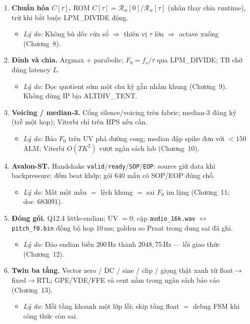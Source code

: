 \begin{enumerate}
\item \textbf{Chuẩn hóa $C[\tau]$.} ROM $C[\tau]=\mathcal{R}_w[0]/\mathcal{R}_w[\tau]$ (nhân thay chia runtime), trừ khi bắt buộc LPM\_DIVIDE động.
\begin{itemize}[leftmargin=1.2em]
    \item \emph{Lý do:} Không bù dốc cửa sổ $\Rightarrow$ thiên vị $\tau$ lớn $\Rightarrow$ octave xuống (Chương~8).
\end{itemize}

\item \textbf{Đỉnh và chia.} Argmax + parabolic; $F_0=f_s/\tau$ qua LPM\_DIVIDE; TB chờ đúng latency $L$.
\begin{itemize}[leftmargin=1.2em]
    \item \emph{Lý do:} Đọc quotient sớm một chu kỳ gắn nhầm khung (Chương~9). Không dùng IP bịa ALTDIV\_TENT.
\end{itemize}

\item \textbf{Voicing / median-3.} Cổng silence/voicing trên fabric;
median-3 đăng ký (trễ một hop);
Viterbi chỉ trên HPS nếu cần.
\begin{itemize}[leftmargin=1.2em]
    \item \emph{Lý do:} Báo $F_0$ trên UV phá đường cong; median đập spike đơn với $<150$ ALM; Viterbi $O(TK^2)$ vượt ngân sách lab (Chương~10).
\end{itemize}

\item \textbf{Avalon-ST.} Handshake \texttt{valid}/\texttt{ready}/\texttt{SOP}/\texttt{EOP}: source giữ data khi backpressure; đếm beat khớp; gói $640$ mẫu có SOP/EOP đúng chỗ.
\begin{itemize}[leftmargin=1.2em]
    \item \emph{Lý do:} Mất một mẫu $=$ lệch khung $=$ sai $F_0$ im lặng (Chương~11; doc~683091).
\end{itemize}

\item \textbf{Đóng gói.} Q12.4 little-endian; UV $=0$; cặp \texttt{audio\_16k.wav} $\leftrightarrow$ \texttt{pitch\_f0.bin} đồng bộ hop $10\,\text{ms}$; golden so Praat trong dung sai đã ghi.
\begin{itemize}[leftmargin=1.2em]
    \item \emph{Lý do:} Đảo endian biến $200\,\text{Hz}$ thành $2048{,}75\,\text{Hz}$ --- lỗi giao thức (Chương~12).
\end{itemize}

\item \textbf{Twin ba tầng.} Vector zero / DC / sine / clip / giọng thật xanh từ float$\to$fixed$\to$RTL; GPE/VDE/FFE và cent nằm trong ngân sách báo cáo (Chương~13).
\begin{itemize}[leftmargin=1.2em]
    \item \emph{Lý do:} Mỗi tầng khoanh một lớp lỗi; skip tầng float $= $ debug FSM khi công thức còn sai.
\end{itemize}


\end{enumerate}
